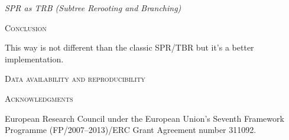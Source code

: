 \documentclass[12pt,letterpaper]{article}
\renewcommand{\section}[1]{%
\bigskip
\begin{center}
\begin{Large}
\normalfont\scshape #1
\medskip
\end{Large}
\end{center}}
\renewcommand{\subsection}[1]{%
\bigskip
\begin{center}
\begin{large}
\normalfont\itshape #1
\end{large}
\end{center}}
\begin{document}
\subsection{SPR as TRB (Subtree Rerooting and Branching)}

\section{Conclusion}

This way is not different than the classic SPR/TBR but it's a better implementation.

\section{Data availability and reproducibility}


\section{Acknowledgments}
European Research Council under the European Union’s Seventh Framework Programme (FP/2007–2013)/ERC Grant Agreement number 311092.




\end{document}
